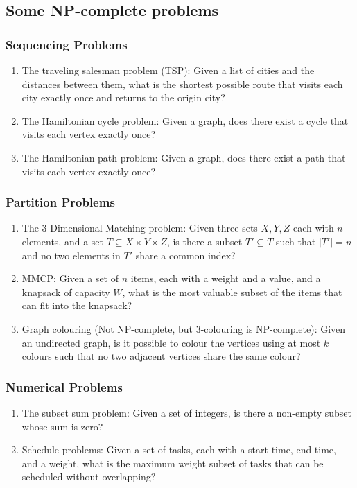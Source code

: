 \documentclass[conference]{IEEEtran}
\begin{document}
\subsection{Some NP-complete problems}
\subsubsection{Sequencing Problems}
\begin{enumerate}
    \item The traveling salesman problem (TSP): Given a list of cities and the distances between them, what is the shortest possible route that visits each city exactly once and returns to the origin city?
    \item The Hamiltonian cycle problem: Given a graph, does there exist a cycle that visits each vertex exactly once?
    \item The Hamiltonian path problem: Given a graph, does there exist a path that visits each vertex exactly once?
\end{enumerate}
\subsubsection{Partition Problems}
\begin{enumerate}
    \item The 3 Dimensional Matching problem: Given three sets $X, Y, Z$ each with $n$ elements, and a set $T \subseteq X \times Y \times Z$, is there a subset $T' \subseteq T$ such that $|T'| = n$ and no two elements in $T'$ share a common index?
    \item MMCP: Given a set of $n$ items, each with a weight and a value, and a knapsack of capacity $W$, what is the most valuable subset of the items that can fit into the knapsack?
    \item Graph colouring (Not NP-complete, but 3-colouring is NP-complete): Given an undirected graph, is it possible to colour the vertices using at most $k$ colours such that no two adjacent vertices share the same colour?
\end{enumerate}
\subsubsection{Numerical Problems}
\begin{enumerate}
    \item The subset sum problem: Given a set of integers, is there a non-empty subset whose sum is zero?
    \item Schedule problems: Given a set of tasks, each with a start time, end time, and a weight, what is the maximum weight subset of tasks that can be scheduled without overlapping?
\end{enumerate}
\end{document}

